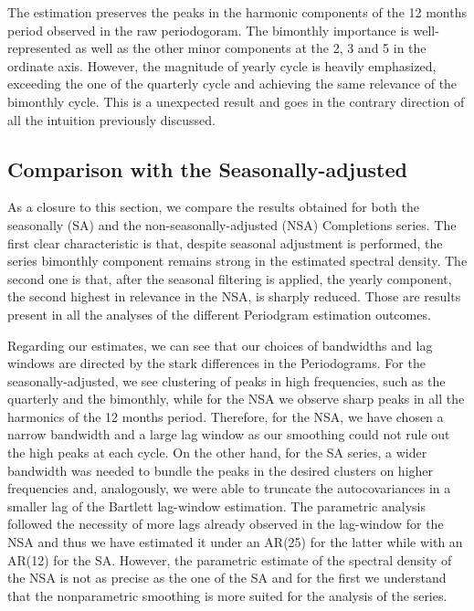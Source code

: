 \documentclass[12pt]{article} %
\begin{document}
The estimation preserves the peaks in the harmonic components of the 12 months period observed in the raw periodogoram. The bimonthly importance is well-represented as well as the other minor components at the 2, 3 and 5 in the ordinate axis.  However, the magnitude of yearly cycle is heavily emphasized, exceeding the one of the quarterly cycle and achieving the same relevance of the bimonthly cycle. This is a unexpected result and goes in the contrary direction of all the intuition previously discussed.

\subsection{Comparison with the Seasonally-adjusted}

As a closure to this section, we compare the results obtained for both the seasonally (SA) and the non-seasonally-adjusted (NSA) Completions series. The first clear characteristic is that, despite seasonal adjustment is performed, the series bimonthly component remains strong in the estimated spectral density. The second one is that, after the seasonal filtering is applied, the yearly component, the second highest in relevance in the NSA, is sharply reduced. Those are results present in all the analyses of the different Periodgram estimation outcomes.

Regarding our estimates, we can see that our choices of bandwidths and lag windows are directed by the stark differences in the Periodograms. For the seasonally-adjusted, we see clustering of peaks in high frequencies, such as the quarterly and the bimonthly, while for the NSA we observe sharp peaks in all the harmonics of the 12 months period. Therefore, for the NSA, we have chosen a narrow bandwidth and a large lag window as our smoothing could not rule out the high peaks at each cycle. On the other hand, for the SA series, a wider bandwidth was needed to bundle the peaks in the desired clusters on higher frequencies and, analogously, we were able to truncate the autocovariances in a smaller lag of the Bartlett lag-window estimation. The parametric analysis followed the necessity of more lags already observed in the lag-window for the NSA and thus we have estimated it under an AR(25) for the latter while with an AR(12) for the SA. However, the parametric estimate of the spectral density of the NSA is not as precise as the one of the SA and for the first we understand that the nonparametric smoothing is more suited for the analysis of the series. 
\end{document}
